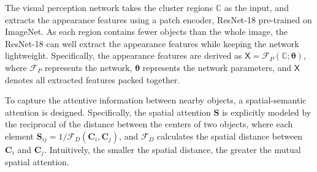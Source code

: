 \documentclass[letterpaper]{article} %
\def \eg {\emph{e.g.}}
\newcommand\red[1]{\textcolor{red}{#1}}
\newcommand\blue[1]{\textcolor{blue}{#1}}
\newcommand\rjf[1]{\textcolor{red}{\{RJF: #1\}}}
\newcommand\qz[1]{\textcolor{blue}{\{QZ: #1\}}}
\begin{document}
The visual perception network takes the cluster regions $\mathbb{C}$ as the input, and extracts the appearance features using a patch encoder, ResNet-18 pre-trained on ImageNet. As each region contains fewer objects than the whole image, %
the ResNet-18 can well extract the appearance features while keeping the network lightweight. 
Specifically, %
the appearance features are derived as $\bm{\mathsf{X}} = \mathcal{F}_{P}\left(\mathbb{C}; \bm{\theta}\right)$, where $\mathcal{F}_P$ represents the network, $\bm{\theta}$ represents the network parameters, and $\bm{\mathsf{X}}$ denotes all extracted features packed together. 

To capture the attentive information between nearby objects, a spatial-semantic attention is designed. Specifically, 
the spatial attention $\bm{S}$ is explicitly modeled by the reciprocal of the distance between the centers of two objects, %
where each element %
$\bm{S}_{ij} = 1/\mathcal{F}_{D}(\bm{C}_i, \bm{C}_j)$, and $\mathcal{F}_{D}$ calculates the spatial distance between $\bm{C}_i$ and $\bm{C}_j$. %
Intuitively, the smaller the spatial distance, the greater the mutual spatial attention. %


\end{document}
